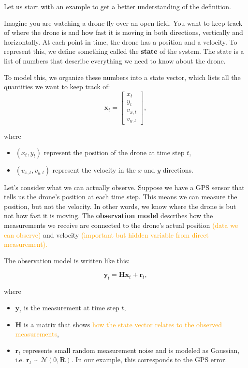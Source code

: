 \noindent Let us start with an example to get a better understanding of the definition.
\begin{example}
Imagine you are watching a drone fly over an open field. You want to keep track of where the drone is and how fast it is moving in both directions, vertically and horizontally. At each point in time, the drone has a position and a velocity. To represent this, we define something called the \textbf{state} of the system. The state is a list of numbers that describe everything we need to know about the drone.

To model this, we organize these numbers into a state vector, which lists all the quantities we want to keep track of: 
\[ \mathbf{x}_t = \begin{bmatrix}
    x_t \\ y_t \\ v_{x,t} \\ v_{y,t}
\end{bmatrix},\]

where
\begin{itemize}
    \item $(x_t,y_t)$ represent the position of the drone at time step $t$,
    \item $(v_{x,t},v_{y,t})$ represent the velocity in the $x$ and $y$ directions. 
\end{itemize}


Let's consider what we can actually observe. Suppose we have a GPS sensor that tells us the drone's position at each time step. This means we can measure the position, but not the velocity. In other words, we know where the drone is but not how fast it is moving. The \textbf{observation model} describes how the measurements we receive are connected to the drone's actual position \textcolor{orange}{(data we can observe)} and velocity \textcolor{orange}{(important but hidden variable from direct measurement).} 

The observation model is written like this: 

\begin{equation}\label{eq: observation model}
\textbf{y}_t = \textbf{H}\textbf{x}_{t}+\textbf{r}_{t},   
\end{equation}

where 
\begin{itemize}
    \item $\textbf{y}_t$ is the measurement at time step $t$,
    \item $\textbf{H}$ is a matrix that shows \textcolor{orange}{how the state vector relates to the observed measurements},
    \item $\mathbf{r}_t$ represents small random measurement noise and is modeled as Gaussian, i.e. $\mathbf{r}_t \sim \mathcal{N}(0, \mathbf{R})$. In our example, this corresponds to the GPS error. 
\end{itemize}


\end{example}
